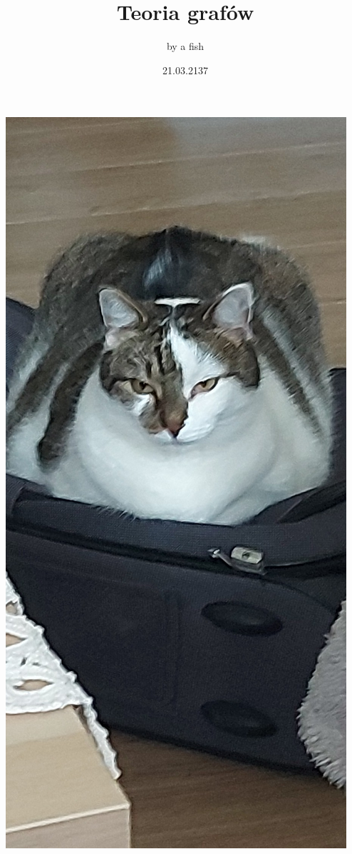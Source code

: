 \documentclass{article}[17pt]
\title {Teoria grafów}
\author{by a fish}
\date {21.03.2137}
\begin{document}
\maketitle

\newpage

\begin{center}
    \includegraphics[height=\textheight]{potega.jpg}
\end{center}

\newpage

\tableofcontents

\newpage



\newpage



\newpage



\newpage


\end{document}
